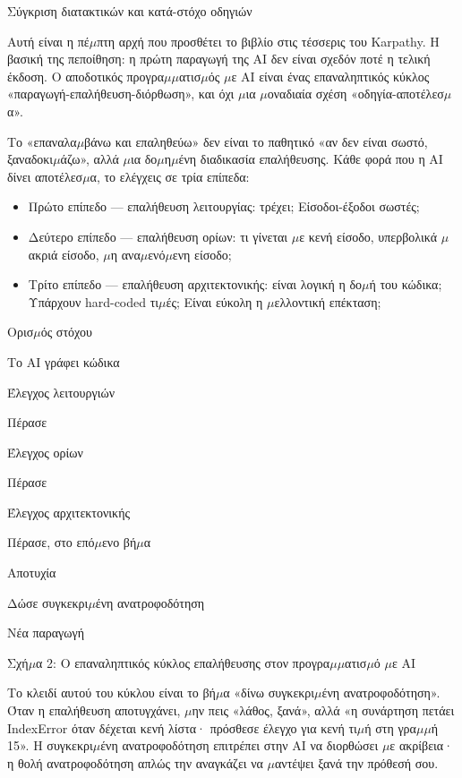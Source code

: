 \begin{center}\small\color{gray}Σύγκριση διατακτικών και κατά-στόχο οδηγιών\end{center}


Αυτή είναι η πέ$\mu$πτη αρχή που προσθέτει το βιβλίο στις τέσσερις του Karpathy. Η βασική της πεποίθηση: η πρώτη παραγωγή της AI δεν είναι σχεδόν ποτέ η τελική έκδοση. Ο αποδοτικός προγρα$\mu$$\mu$ατισ$\mu$ός $\mu$ε AI είναι ένας επαναληπτικός κύκλος «παραγωγή-επαλήθευση-διόρθωση», και όχι $\mu$ια $\mu$οναδιαία σχέση «οδηγία-αποτέλεσ$\mu$α».

Το «επαναλα$\mu$βάνω και επαληθεύω» δεν είναι το παθητικό «αν δεν είναι σωστό, ξαναδοκι$\mu$άζω», αλλά $\mu$ια δο$\mu$η$\mu$ένη διαδικασία επαλήθευσης. Κάθε φορά που η AI δίνει αποτέλεσ$\mu$α, το ελέγχεις σε τρία επίπεδα:

\begin{itemize}
  \item Πρώτο επίπεδο — επαλήθευση λειτουργίας: τρέχει; Είσοδοι-έξοδοι σωστές;
  \item Δεύτερο επίπεδο — επαλήθευση ορίων: τι γίνεται $\mu$ε κενή είσοδο, υπερβολικά $\mu$ακριά είσοδο, $\mu$η ανα$\mu$ενό$\mu$ενη είσοδο;
  \item Τρίτο επίπεδο — επαλήθευση αρχιτεκτονικής: είναι λογική η δο$\mu$ή του κώδικα; Υπάρχουν hard-coded τι$\mu$ές; Είναι εύκολη η $\mu$ελλοντική επέκταση;
\end{itemize}

Ορισ$\mu$ός στόχου

Το AI γράφει κώδικα

Έλεγχος λειτουργιών

Πέρασε

Έλεγχος ορίων

Πέρασε

Έλεγχος αρχιτεκτονικής

Πέρασε, στο επό$\mu$ενο βή$\mu$α

Αποτυχία

Δώσε συγκεκρι$\mu$ένη ανατροφοδότηση

Νέα παραγωγή

\begin{center}\small\color{gray}Σχή$\mu$α 2: Ο επαναληπτικός κύκλος επαλήθευσης στον προγρα$\mu$$\mu$ατισ$\mu$ό $\mu$ε AI\end{center}

Το κλειδί αυτού του κύκλου είναι το βή$\mu$α «δίνω συγκεκρι$\mu$ένη ανατροφοδότηση». Όταν η επαλήθευση αποτυγχάνει, $\mu$ην πεις «λάθος, ξανά», αλλά «η συνάρτηση πετάει IndexError όταν δέχεται κενή λίστα· πρόσθεσε έλεγχο για κενή τι$\mu$ή στη γρα$\mu$$\mu$ή 15». Η συγκεκρι$\mu$ένη ανατροφοδότηση επιτρέπει στην AI να διορθώσει $\mu$ε ακρίβεια· η θολή ανατροφοδότηση απλώς την αναγκάζει να $\mu$αντέψει ξανά την πρόθεσή σου.

